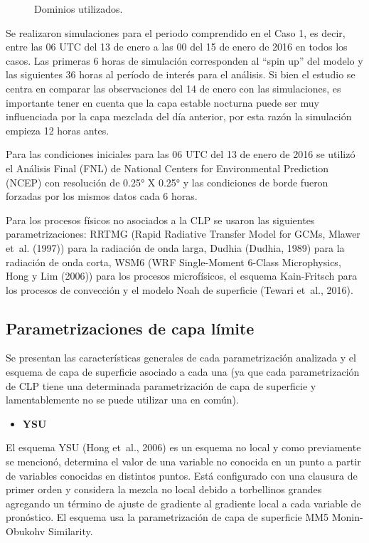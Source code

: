 \documentclass[12pt,spanish,oneside, a4paper]{book}
\providecommand{\tightlist}{%
  \setlength{\itemsep}{0pt}\setlength{\parskip}{0pt}}
\begin{document}
\begin{figure}
{}

\caption{Dominios utilizados. \label{dominio}}\label{fig:dominio}
\end{figure}

Se realizaron simulaciones para el periodo comprendido en el Caso 1, es
decir, entre las 06 UTC del 13 de enero a las 00 del 15 de enero de 2016
en todos los casos. Las primeras 6 horas de simulación corresponden al
``spin up'' del modelo y las siguientes 36 horas al período de interés
para el análisis. Si bien el estudio se centra en comparar las
observaciones del 14 de enero con las simulaciones, es importante tener
en cuenta que la capa estable nocturna puede ser muy influenciada por la
capa mezclada del día anterior, por esta razón la simulación empieza 12
horas antes.

Para las condiciones iniciales para las 06 UTC del 13 de enero de 2016
se utilizó el Análisis Final (FNL) de National Centers for Environmental
Prediction (NCEP) con resolución de 0.25° X 0.25° y las condiciones de
borde fueron forzadas por los mismos datos cada 6 horas.

Para los procesos físicos no asociados a la CLP se usaron las siguientes
parametrizaciones: RRTMG (Rapid Radiative Transfer Model for GCMs,
Mlawer et~al. (1997)) para la radiación de onda larga, Dudhia (Dudhia,
1989) para la radiación de onda corta, WSM6 (WRF Single-Moment 6-Class
Microphysics, Hong y Lim (2006)) para los procesos microfísicos, el
esquema Kain-Fritsch para los procesos de convección y el modelo Noah de
superficie (Tewari et~al., 2016).

\subsection{Parametrizaciones de capa
límite}\label{parametrizaciones-de-capa-limite}

Se presentan las características generales de cada parametrización
analizada y el esquema de capa de superficie asociado a cada una (ya que
cada parametrización de CLP tiene una determinada parametrización de
capa de superficie y lamentablemente no se puede utilizar una en común).

\begin{itemize}
\tightlist
\item
  \textbf{YSU}
\end{itemize}

El esquema YSU (Hong et~al., 2006) es un esquema no local y como
previamente se mencionó, determina el valor de una variable no conocida
en un punto a partir de variables conocidas en distintos puntos. Está
configurado con una clausura de primer orden y considera la mezcla no
local debido a torbellinos grandes agregando un término de ajuste de
gradiente al gradiente local a cada variable de pronóstico. El esquema
usa la parametrización de capa de superficie MM5 Monin-Obukohv
Similarity.
\end{document}

